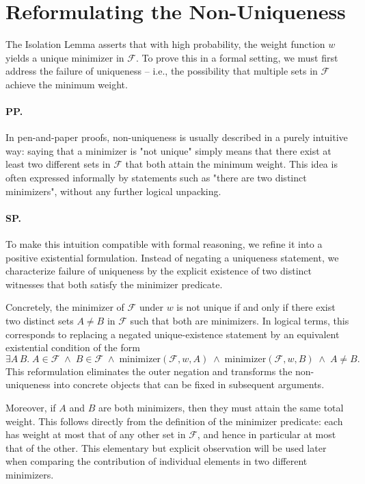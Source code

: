 \section{Reformulating the Non-Uniqueness}
\label{sec:non-unique}

The Isolation Lemma asserts that with high probability, the weight function $w$ yields a unique minimizer in $\mathcal{F}$.
To prove this in a formal setting, we must first address the failure of uniqueness -- i.e., the possibility that multiple sets in $\mathcal{F}$ achieve the minimum weight.

\paragraph{PP.}
In pen-and-paper proofs, non-uniqueness is usually described in a purely intuitive way:
saying that a minimizer is "not unique" simply means that there exist at least two different sets in $\mathcal{F}$ that both attain the minimum weight.
This idea is often expressed informally by statements such as "there are two distinct minimizers", without any further logical unpacking.

\paragraph{SP.}
To make this intuition compatible with formal reasoning, we refine it into a positive existential formulation.
Instead of negating a uniqueness statement, we characterize failure of uniqueness by the explicit existence of two distinct witnesses that both satisfy the minimizer predicate.

Concretely, the minimizer of $\mathcal{F}$ under $w$ is not unique if and only if there exist two distinct sets $A \neq B$ in $\mathcal{F}$ such that both are minimizers.
In logical terms, this corresponds to replacing a negated unique-existence statement by an equivalent existential condition of the form
\[
\exists A\, B.\;
A \in \mathcal{F} \;\land\; B \in \mathcal{F} \;\land\;
\text{minimizer}(\mathcal{F}, w, A) \;\land\;
\text{minimizer}(\mathcal{F}, w, B) \;\land\;
A \neq B.
\]
This reformulation eliminates the outer negation and transforms the non-uniqueness into concrete objects that can be fixed in subsequent arguments.

Moreover, if $A$ and $B$ are both minimizers, then they must attain the same total weight.
This follows directly from the definition of the minimizer predicate:
each has weight at most that of any other set in $\mathcal{F}$, and hence in particular at most that of the other.
This elementary but explicit observation will be used later when comparing the contribution of individual elements in two different minimizers.

